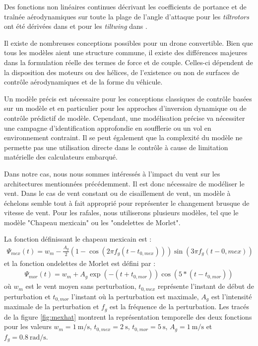 Des fonctions non linéaires continues décrivant les coefficients de portance et de traînée aérodynamiques sur toute la plage de l'angle d'attaque pour les  \textit{tiltrotors} ont été dérivées dans \cite{6981467} et pour les \textit{tiltwing} dans \cite{lustosaHal-03035938,Lustosa2017LaP}.

Il existe de nombreuses conceptions possibles pour un drone convertible. Bien que tous les modèles aient une structure commune, il existe des différences majeures dans la formulation réelle des termes de force et de couple. Celles-ci dépendent de la disposition des moteurs ou des hélices, de l'existence ou non de surfaces de contrôle aérodynamiques et de la forme du véhicule.

Un modèle précis est nécessaire pour les conceptions classiques de contrôle basées sur un modèle et en particulier pour les approches d'inversion dynamique ou de contrôle prédictif de modèle. Cependant, une modélisation précise va nécessiter une campagne d'identification approfondie en soufflerie ou un vol en environnement contraint. Il se peut également que la complexité du modèle ne permette pas une utilisation directe dans le contrôle à cause de limitation matérielle des calculateurs embarqué.


Dans notre cas, nous nous sommes intéressés à l'impact du vent sur les architectures mentionnées précédemment. Il est donc nécessaire de modéliser le vent. Dans le cas de vent constant ou de cisaillement de vent, un modèle à échelons semble tout à fait approprié pour représenter le changement brusque de vitesse de vent. 
Pour les rafales, nous utiliserons plusieurs modèles, tel que le modèle "Chapeau mexicain" ou les "ondelettes de Morlet".

La fonction définissant le chapeau mexicain est :
\begin{align}
    \Psi_{mex}(t)= w_{m} - \frac{A_g}{2} \left(1-\cos(2 \pi f_g (t-t_{0,mex}))\right)\sin(3 \pi f_g (t-{0,mex}))
\end{align}
et la fonction ondelettes de Morlet est défini par :
\begin{align}
    \Psi_{mor}(t)=  w_{m} + A_g \exp(-(t+t_{0,mor})) \cos(5*(t-t_{0,mor}))
\end{align}
où $w_{m}$ est le vent moyen sans perturbation, $t_{0,mex}$ représente l'instant de début de perturbation et $t_{0,mor}$ l'instant où la perturbation est maximale, $A_g$ est l'intensité maximale de la perturbation et  $f_g$ est la fréquence de la perturbation. Les tracés de la figure \ref{fig:mexhat} montrent la représentation temporelle des deux fonctions pour les valeurs $w_{m} = \SI{1}{\meter\per\second}$, $t_{0,mex} = \SI{2}{\second}$,  $t_{0,mor} = \SI{5}{\second}$, $A_g = \SI{1}{\meter\per\second}$ et $f_g = \SI{0.8}{\radian\per\second}$.



